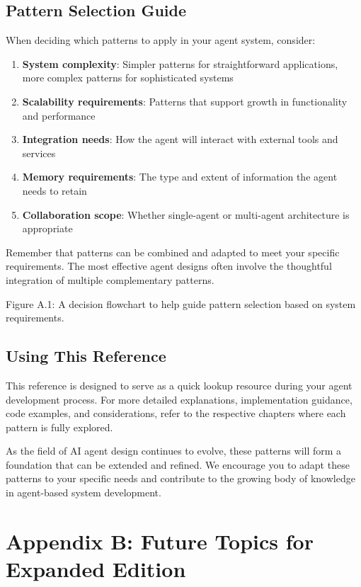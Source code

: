 \documentclass[11pt,oneside]{book}
\providecommand{\tightlist}{%
  \setlength{\itemsep}{0pt}\setlength{\parskip}{0pt}}
\begin{document}
\section{Pattern Selection Guide}\label{pattern-selection-guide}

When deciding which patterns to apply in your agent system, consider:

\begin{enumerate}
\def\labelenumi{\arabic{enumi}.}
\tightlist
\item
  \textbf{System complexity}: Simpler patterns for straightforward
  applications, more complex patterns for sophisticated systems
\item
  \textbf{Scalability requirements}: Patterns that support growth in
  functionality and performance
\item
  \textbf{Integration needs}: How the agent will interact with external
  tools and services
\item
  \textbf{Memory requirements}: The type and extent of information the
  agent needs to retain
\item
  \textbf{Collaboration scope}: Whether single-agent or multi-agent
  architecture is appropriate
\end{enumerate}

Remember that patterns can be combined and adapted to meet your specific
requirements. The most effective agent designs often involve the
thoughtful integration of multiple complementary patterns.

Figure A.1: A decision flowchart to help guide pattern selection based
on system requirements.

\section{Using This Reference}\label{using-this-reference}

This reference is designed to serve as a quick lookup resource during
your agent development process. For more detailed explanations,
implementation guidance, code examples, and considerations, refer to the
respective chapters where each pattern is fully explored.

As the field of AI agent design continues to evolve, these patterns will
form a foundation that can be extended and refined. We encourage you to
adapt these patterns to your specific needs and contribute to the
growing body of knowledge in agent-based system development.

\chapter{Appendix B: Future Topics for Expanded
Edition}\label{appendix-b-future-topics-for-expanded-edition}
\end{document}

